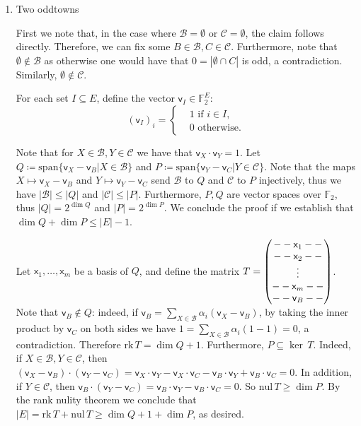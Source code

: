 \documentclass[kulak]{tplt}
\theoremstyle{definition}
\newcommand{\F}{\mathbb{F}}
\newcommand{\vv}{\mathsf{v}}
\newcommand{\vx}{\mathsf{x}}
\newcommand{\spn}{\mathrm{span}}
\newcommand{\rk}{\mathrm{rk}}
\newcommand{\nul}{\mathrm{nul}}
\begin{document}
\begin{enumerate}
\item Two oddtowns

First we note that, in the case where $\mathcal B = \emptyset $ or $\mathcal C = \emptyset$, the claim follows directly.
Therefore, we can fix some $B \in \mathcal B, C \in \mathcal C$.
Furthermore, note that $\emptyset \not\in\mathcal B$ as otherwise one would have that $ 0 = |\emptyset \cap C|$ is odd, a contradiction.
Similarly, $\emptyset \not\in \mathcal C$.

For each set $I \subseteq E$, define the vector $\vv_I \in \F_2^E$:
$$ (\vv_I)_i =\begin{cases*}
      & 1 \text{ if $i \in I$,}\\
      & 0 \text{ otherwise.}
    \end{cases*} $$

Note that for $X \in \mathcal B,  Y \in \mathcal C$ we have that $\vv_X \cdot \vv_Y = 1$.
Let $Q \coloneqq \spn \{ \vv_X - \vv_B  | X \in \mathcal B \} $ and $P \coloneqq \spn \{ \vv_Y - \vv_C  | Y \in \mathcal C \} $.
Note that the maps $X \mapsto \vv_X - \vv_B$ and $Y \mapsto \vv_Y - \vv_C$ send $\mathcal B $ to $Q$ and $\mathcal C $ to $P$ injectively, thus we have $|\mathcal B| \leq |Q|$ and $|\mathcal C | \leq |P|$.
Furthermore, $P, Q$ are vector spaces over $\F_2$, thus $|Q| = 2^{\dim Q}$ and $|P| = 2^{\dim P}$.
We conclude the proof if we establish that $\dim Q + \dim P  \leq |E| - 1$.

Let $\vx_1, \ldots, \vx_m$ be a basis of $Q$, and define the matrix $T = \begin{pmatrix}
 \-- \-- \vx_1 \--\-- \\  \--\--  \vx_2 \-- \--\\ \vdots \\  \-- \-- \vx_m \--\-- \\  \--\--  \vv_B \--\--
\end{pmatrix}$.
Note that $\vv_B \not\in Q$: indeed, if $\vv_B = \sum_{X \in \mathcal B} \alpha_i (\vv_X - \vv_B)$, by taking the inner product by $\vv_C$ on both sides we have $1 = \sum_{X \in \mathcal B} \alpha_i (1 - 1) = 0$, a contradiction.
Therefore $\rk\, T = \dim Q + 1$.
Furthermore, $P \subseteq \ker \, T$.
Indeed, if $X \in \mathcal B,  Y \in \mathcal C$, then $(\vv_X - \vv_B)\cdot (\vv_Y - \vv_C) = \vv_X\cdot \vv_Y - \vv_X\cdot \vv_C - \vv_B\cdot \vv_Y + \vv_B\cdot \vv_C = 0$.
In addition, if $Y \in \mathcal C$, then $\vv_B\cdot (\vv_Y - \vv_C) = \vv_B\cdot \vv_Y - \vv_B\cdot \vv_C = 0$.
So $\nul\, T \geq \dim P$.
By the rank nulity theorem we conclude that $|E| = \rk \, T  + \nul \, T \geq \dim Q + 1 + \dim P$, as desired.



\end{enumerate}
\end{document}
